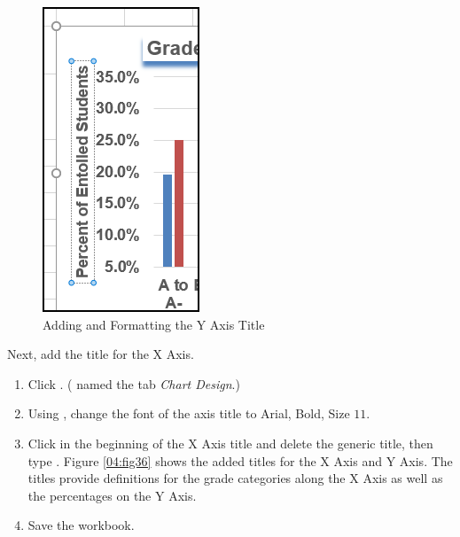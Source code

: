 \begin{figure}[H]
	\centering
	\includegraphics[width=\maxwidth{.95\linewidth}]{gfx/ch04_fig35}
	\caption{Adding and Formatting the Y Axis Title}
	\label{04:fig35}
\end{figure}

Next, add the title for the X Axis.

\begin{enumbox}
	\begin{enumerate}
		\item Click . ( named the tab \textit{Chart Design}.)
		\item Using , change the font of the axis title to Arial, Bold, Size $ 11 $. 
		\item Click in the beginning of the X Axis title and delete the generic title, then type . Figure \ref{04:fig36} shows the added titles for the X Axis and Y Axis. The titles provide definitions for the grade categories along the X Axis as well as the percentages on the Y Axis.
		\item Save the  workbook.
	\end{enumerate}
\end{enumbox}
	
